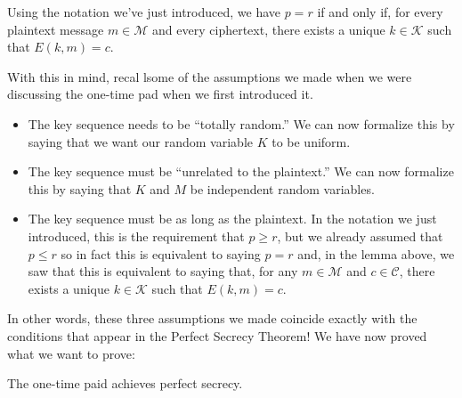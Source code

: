 \documentclass[letterpaper]{article}
\begin{document}
\begin{lemma}{}{}
    Using the notation we've just introduced, we have $p = r$ if and only if, for every plaintext message $m \in \mathscr{M}$ and every ciphertext, there exists a unique $k \in \mathscr{K}$ such that $E(k, m) = c$. 
\end{lemma}
With this in mind, recal lsome of the assumptions we made when we were discussing the one-time pad when we first introduced it. 
\begin{itemize}
    \item The key sequence needs to be ``totally random.'' We can now formalize this by saying that we want our random variable $K$ to be uniform. 
    \item The key sequence must be ``unrelated to the plaintext.'' We can now formalize this by saying that $K$ and $M$ be independent random variables. 
    \item The key sequence must be as long as the plaintext. In the notation we just introduced, this is the requirement that $p \geq r$, but we already assumed that $p \leq r$ so in fact this is equivalent to saying $p = r$ and, in the lemma above, we saw that this is equivalent to saying that, for any $m \in \mathscr{M}$ and $c \in \mathscr{C}$, there exists a unique $k \in \mathscr{K}$ such that $E(k, m) = c$. 
\end{itemize}
In other words, these three assumptions we made coincide exactly with the conditions that appear in the Perfect Secrecy Theorem! We have now proved what we want to prove:
\begin{corollary}{}{}
    The one-time paid achieves perfect secrecy.
\end{corollary}
\end{document}
